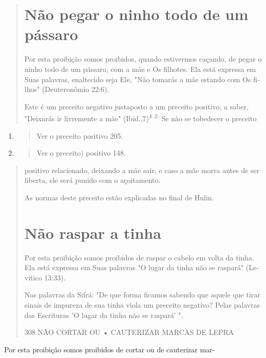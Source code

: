 \begin{quote}
\section{Não pegar o ninho todo de um pássaro}

Por esta proibição somos proibidos, quando estivermos caçando, de pegar
o ninho todo de um pássaro, com a mãe e Os filhotes. Ela está expressa
em Suas palavras, enaltecido seja Ele, "Não tomarás a mãe estando com Os
fi­lhos" (Deuteronômio 22:6).

Este é um preceito negativo justaposto a um preceito positivo, a sa­ber,
"Deixarás ir livremente a mãe" (Ibid.,7)\textsuperscript{4 \emph{2-}} Se
não se tobedecer o preceito
\end{quote}

\begin{enumerate}
\def\labelenumi{\arabic{enumi}.}
\setcounter{enumi}{425}
\item
 \begin{quote}
 Ver o preceito positivo 205.
 \end{quote}
\item
 \begin{quote}
 Ver o preceito) positivo 148.
 \end{quote}
\end{enumerate}

\begin{quote}
positivo relacionado, deixando a mãe sair, e caso a mãe morra antes de
ser li­berta, ele será punido com o açoitamento.

As normas deste preceito estão explicadas no final de Hulin.

\section{Não raspar a tinha}

Por esta proibição somos proibidos de raspar o cabelo em volta da tinha.
Ela está expressa em Suas palavras "O lugar da tinha não se raspará"
(Le­vítico 13:33).

Nas palavras da Sifrá: "De que forma ficamos sabendo que aquele que
tirar sinais de impureza de sua tinha viola um preceito negativo? Pelas
pala­vras das Escrituras 'O lugar da tinha não se raspará' ".

308 NÃO CORTAR OU • CAUTERIZAR MARCAS DE LEPRA
\end{quote}

Por esta proibição somos proibidos de cortar ou de cauterizar mar-

